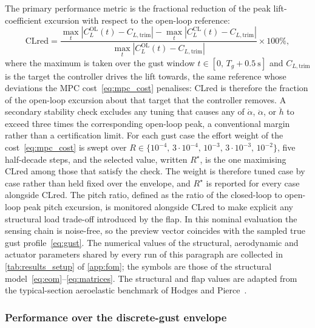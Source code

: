 The primary performance metric is the fractional reduction of the peak
lift-coefficient excursion with respect to the open-loop reference:
\begin{equation}
    \mathrm{CLred} = \frac{\max_t |C_L^{\mathrm{OL}}(t) - C_{L,\mathrm{trim}}|
                         - \max_t |C_L^{\mathrm{CL}}(t) - C_{L,\mathrm{trim}}|}
                         {\max_t |C_L^{\mathrm{OL}}(t) - C_{L,\mathrm{trim}}|}
                    \times 100\%,
\label{eq:clred}
\end{equation}
where the maximum is taken over the gust window $t \in [0,\, T_g + \SI{0.5}{\second}]$ and
$C_{L,\mathrm{trim}}$ is the target the controller drives the lift towards, the same
reference whose deviations the MPC cost~\eqref{eq:mpc_cost} penalises: CLred is therefore
the fraction of the open-loop excursion about that target that the controller removes.
A secondary stability check excludes any tuning that causes any of
$\dot\alpha$, $\ddot\alpha$, or $\ddot h$ to exceed three times the
corresponding open-loop peak, a conventional margin rather than a certification limit.
For each gust case the effort weight
of the cost~\eqref{eq:mpc_cost} is swept over
$R \in \{10^{-4},\,3\cdot10^{-4},\,10^{-3},\,3\cdot10^{-3},\,10^{-2}\}$,
five half-decade steps, and the selected value, written $R^{\star}$, is the
one maximising CLred among those that satisfy the check. The weight is
therefore tuned case by case rather than held fixed over the envelope, and
$R^{\star}$ is reported for every case alongside CLred.
The pitch ratio, defined as the ratio of the closed-loop to open-loop peak
pitch excursion, is monitored alongside CLred to make explicit any structural
load trade-off introduced by the flap. In this nominal evaluation the sensing
chain is noise-free, so the preview vector coincides with the sampled true
gust profile~\eqref{eq:gust}.
The numerical values of the structural, aerodynamic and actuator parameters shared by every
run of this paragraph are collected in \cref{tab:results_setup} of \cref{app:fom}; the symbols
are those of the structural model~\eqref{eq:eom}--\eqref{eq:matrices}. The structural and flap
values are adapted from the typical-section aeroelastic benchmark of Hodges and
Pierce~\cite{hodges2011aeroelasticity}.

\subsubsection{Performance over the discrete-gust envelope}

